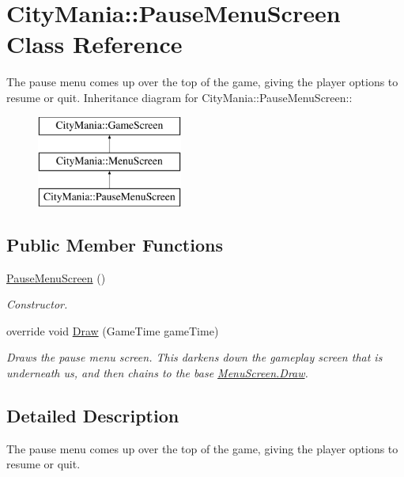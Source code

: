 \hypertarget{classCityMania_1_1PauseMenuScreen}{
\section{CityMania::PauseMenuScreen Class Reference}
\label{classCityMania_1_1PauseMenuScreen}
}


The pause menu comes up over the top of the game, giving the player options to resume or quit.  
Inheritance diagram for CityMania::PauseMenuScreen::\begin{figure}[H]
\begin{center}
\leavevmode
\includegraphics[height=3cm]{classCityMania_1_1PauseMenuScreen}
\end{center}
\end{figure}
\subsection*{Public Member Functions}
\begin{DoxyCompactItemize}
\item 
\hyperlink{classCityMania_1_1PauseMenuScreen_a60114279ee53066bab947d8e811e929f}{PauseMenuScreen} ()
\begin{DoxyCompactList}\small\item\em Constructor. \item\end{DoxyCompactList}\item 
override void \hyperlink{classCityMania_1_1PauseMenuScreen_a1daaf1e6d3dc66500fcf020c2098a675}{Draw} (GameTime gameTime)
\begin{DoxyCompactList}\small\item\em Draws the pause menu screen. This darkens down the gameplay screen that is underneath us, and then chains to the base \hyperlink{classCityMania_1_1MenuScreen_a433f334c09ea523b02322bd153e960d1}{MenuScreen.Draw}. \item\end{DoxyCompactList}\end{DoxyCompactItemize}


\subsection{Detailed Description}
The pause menu comes up over the top of the game, giving the player options to resume or quit. 

